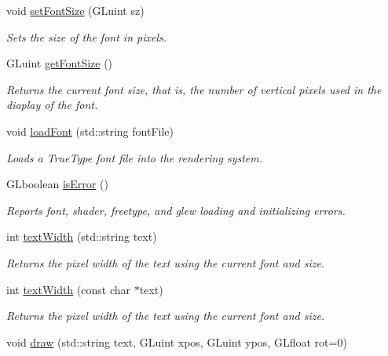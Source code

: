 \begin{DoxyCompactItemize}
void \hyperlink{class_text_renderer_t_t_f_a65a7ec5a55cb3f887494eaf95e78d7c9}{set\+Font\+Size} (G\+Luint sz)
\begin{DoxyCompactList}\small\item\em Sets the size of the font in pixels. \end{DoxyCompactList}\item 
\mbox{\label{class_text_renderer_t_t_f_ae03c8165f75f127be678f7d45b78bbdf}} 
G\+Luint \hyperlink{class_text_renderer_t_t_f_ae03c8165f75f127be678f7d45b78bbdf}{get\+Font\+Size} ()
\begin{DoxyCompactList}\small\item\em Returns the current font size, that is, the number of vertical pixels used in the diaplay of the font. \end{DoxyCompactList}\item 
void \hyperlink{class_text_renderer_t_t_f_aedfacf050040104b67f45e1c6f86b12d}{load\+Font} (std\+::string font\+File)
\begin{DoxyCompactList}\small\item\em Loads a True\+Type font file into the rendering system. \end{DoxyCompactList}\item 
G\+Lboolean \hyperlink{class_text_renderer_t_t_f_acd5638f9f9220a8ca146a3f15a88139e}{is\+Error} ()
\begin{DoxyCompactList}\small\item\em Reports font, shader, freetype, and glew loading and initializing errors. \end{DoxyCompactList}\item 
int \hyperlink{class_text_renderer_t_t_f_a485f53b24384306441987b52b6065af6}{text\+Width} (std\+::string text)
\begin{DoxyCompactList}\small\item\em Returns the pixel width of the text using the current font and size. \end{DoxyCompactList}\item 
int \hyperlink{class_text_renderer_t_t_f_a64698c7661b1e10f08e41fcf8ae9d8f5}{text\+Width} (const char $\ast$text)
\begin{DoxyCompactList}\small\item\em Returns the pixel width of the text using the current font and size. \end{DoxyCompactList}\item 
void \hyperlink{class_text_renderer_t_t_f_a766eef34ac1aa3a409a37b28d744a501}{draw} (std\+::string text, G\+Luint xpos, G\+Luint ypos, G\+Lfloat rot=0)

\end{DoxyCompactItemize}
